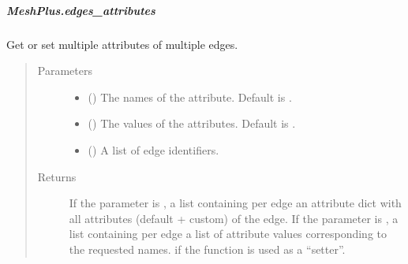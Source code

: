 \documentclass[letterpaper,10pt,english]{sphinxmanual}
\begin{document}
\begin{fulllineitems}
\begin{fulllineitems}
\end{fulllineitems}



\subparagraph{MeshPlus.edges\_attributes}
\label{\detokenize{api/generated/directional_clustering.mesh.MeshPlus.edges_attributes:meshplus-edges-attributes}}\label{\detokenize{api/generated/directional_clustering.mesh.MeshPlus.edges_attributes::doc}}

\begin{fulllineitems}
\label{\detokenize{api/generated/directional_clustering.mesh.MeshPlus.edges_attributes:directional_clustering.mesh.MeshPlus.edges_attributes}}
Get or set multiple attributes of multiple edges.
\begin{quote}\begin{description}
\item[{Parameters}] \leavevmode\begin{itemize}
\item {} 
 () \textendash{} The names of the attribute.
Default is .

\item {} 
 () \textendash{} The values of the attributes.
Default is .

\item {} 
 () \textendash{} A list of edge identifiers.

\end{itemize}

\item[{Returns}] \leavevmode
{} \textendash{} If the parameter  is ,
a list containing per edge an attribute dict with all attributes (default + custom) of the edge.
If the parameter  is ,
a list containing per edge a list of attribute values corresponding to the requested names.
 if the function is used as a “setter”.


\end{description}
\end{quote}
\end{fulllineitems}
\end{fulllineitems}
\end{document}
